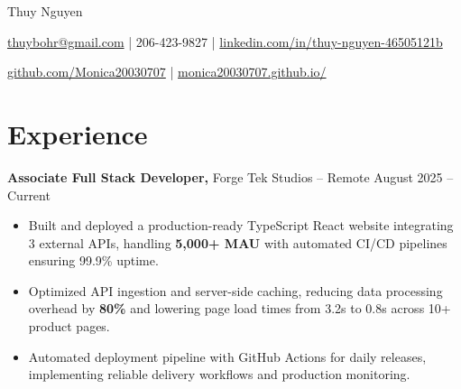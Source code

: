\documentclass[11pt]{article}
\begin{document}
\centerline{\Huge Thuy Nguyen}

\vspace{5pt}

\centerline{\href{mailto:thuybohr@gmail.com}{thuybohr@gmail.com} | 206-423-9827 |
\href{https://www.linkedin.com/in/thuy-nguyen-46505121b/}{linkedin.com/in/thuy-nguyen-46505121b}}

\centerline{\href{https://github.com/Monica20030707}{github.com/Monica20030707} |
\href{https://monica20030707.github.io/}{monica20030707.github.io/}}

\vspace{-9pt}

\section*{Experience}

\textbf{Associate Full Stack Developer,} {Forge Tek Studios} -- Remote \hfill August 2025 -- Current
\vspace{-9pt}
\begin{itemize}
  \item Built and deployed a production-ready TypeScript React website integrating 3 external APIs, handling \textbf{5,000+ MAU} with automated CI/CD pipelines ensuring 99.9\% uptime.
  \item Optimized API ingestion and server-side caching, reducing data processing overhead by \textbf{80\%} and lowering page load times from 3.2s to 0.8s across 10+ product pages.
  \item Automated deployment pipeline with GitHub Actions for daily releases, implementing reliable delivery workflows and production monitoring.
\end{itemize}
\end{document}
